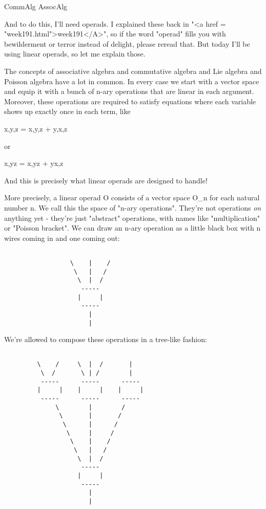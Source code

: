 CommAlg \to  AssocAlg

And to do this, I'll need operads.  I explained these back in "<a
href = "week191.html">week191</A>", so if the word
"operad" fills you with bewilderment or terror instead of
delight, please reread that.  But today I'll be using linear operads,
so let me explain those.

The concepts of associative algebra and commutative algebra and Lie
algebra and Poisson algebra have a lot in common.  In every case we
start with a vector space and equip it with a bunch of n-ary
operations that are linear in each argument.  Moreover, these
operations are required to satisfy equations where each variable shows
up exactly once in each term, like

{x,{y,z}} = {{x,y},z} + {y,{x,z}}

or 

{x,yz} = {x,y}z + y{x,z}

And this is precisely what linear operads are designed to handle!

More precisely, a linear operad O consists of a vector space O_{n} for
each natural number n.  We call this the space of "n-ary operations".
They're not operations \emph{on} anything yet - they're just
"abstract" operations, with names like
"multiplication" or "Poisson bracket".  We can
draw an n-ary operation as a little black box with n wires coming in
and one coming out:


\begin{verbatim}

                  \    |    /
                   \   |   / 
                    \  |  /
                     -----
                    |     | 
                     -----
                       |
                       |
\end{verbatim}
    
We're allowed to compose these operations in a tree-like fashion:


\begin{verbatim}

         \    /     \  |  /       | 
          \  /       \ | /        |
          -----      -----      -----
         |     |    |     |    |     |
          -----      -----      -----
              \        |        /  
               \       |       /
                \      |      /
                 \     |     /
                  \    |    / 
                   \   |   /  
                    \  |  /
                     -----
                    |     | 
                     -----
                       |
                       |
\end{verbatim}
    

